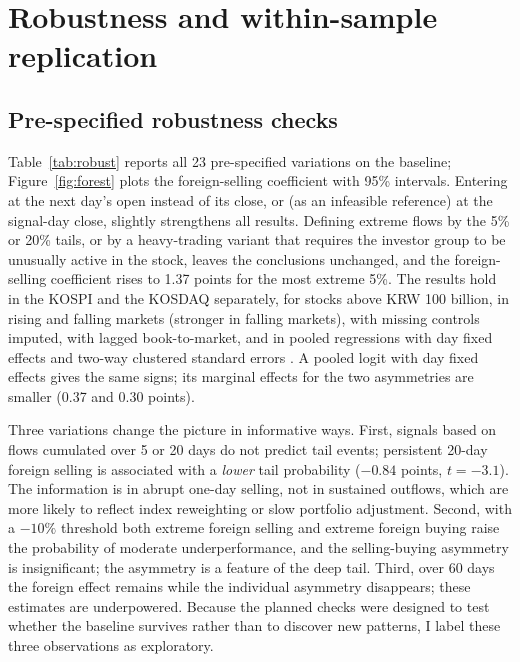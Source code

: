 \documentclass[11pt]{article}
\begin{document}
\section{Robustness and within-sample replication}\label{sec:robust}

\subsection{Pre-specified robustness checks}
Table~\ref{tab:robust} reports all 23 pre-specified variations on the baseline; Figure~\ref{fig:forest} plots the
foreign-selling coefficient with 95\% intervals. Entering at the next day's open instead of its close, or (as an
infeasible reference) at the signal-day close, slightly strengthens all results. Defining extreme flows by the 5\% or
20\% tails, or by a heavy-trading variant that requires the investor group to be unusually active in the stock, leaves
the conclusions unchanged, and the foreign-selling coefficient rises to 1.37 points for the most extreme 5\%. The
results hold in the KOSPI and the KOSDAQ separately, for stocks above KRW 100 billion, in rising and falling markets
(stronger in falling markets), with missing controls imputed, with lagged book-to-market, and in pooled regressions
with day fixed effects and two-way clustered standard errors \citep{petersen2009,cameron2011}. A pooled logit with day
fixed effects gives the same signs; its marginal effects for the two asymmetries are smaller (0.37 and 0.30 points).

Three variations change the picture in informative ways. First, signals based on flows cumulated over 5 or 20 days do
not predict tail events; persistent 20-day foreign selling is associated with a \emph{lower} tail probability
($-0.84$ points, $t=-3.1$). The information is in abrupt one-day selling, not in sustained outflows, which are more
likely to reflect index reweighting or slow portfolio adjustment. Second, with a $-10\%$ threshold both extreme
foreign selling and extreme foreign buying raise the probability of moderate underperformance, and the selling-buying
asymmetry is insignificant; the asymmetry is a feature of the deep tail. Third, over 60 days the foreign effect
remains while the individual asymmetry disappears; these estimates are underpowered. Because the planned checks were
designed to test whether the baseline survives rather than to discover new patterns, I label these three observations
as exploratory.


\end{document}
